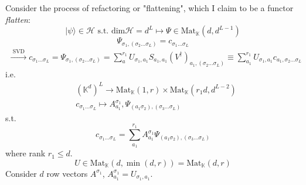\documentclass[10pt]{amsart}
\begin{document}
\begin{multicols*}{2}
Consider the process of refactoring or "flattening", which I claim to be a functor \emph{flatten}: 
\[
| \psi \rangle \in \mathcal{H} \text{ s.t. } \text{dim}\mathcal{H} = d^L \mapsto \Psi \in \text{Mat}_{\mathbb{K}}(d,d^{L-1})
\]
\[
\Psi_{\sigma_1, (\sigma_2 \dots \sigma_L) } = c_{\sigma_1 \dots \sigma_L}
\]
\begin{equation}
\begin{gathered}
\xrightarrow{ \text{ SVD } } c_{\sigma_1 \dots \sigma_L} = \Psi_{\sigma_1, (\sigma_2 \dots \sigma_L)} = \sum_a^{r_1} U_{\sigma_1, a_1} S_{a_1,a_1} (V^{\dag})_{a_1, (\sigma_2 \dots \sigma_L)} \equiv \sum_{a_1}^{r_1} U_{\sigma_1 , a_1} c_{a_1 , \sigma_2 \dots \sigma_L}
\end{gathered}
\end{equation}
i.e.
\[
\begin{aligned}
	& (\mathbb{K}^d)^L \to \text{Mat}_{\mathbb{K}}(1,r) \times \text{Mat}_{\mathbb{K}}(r_1 d, d^{L-2}) \\ 
	& c_{\sigma_1 \dots \sigma_L} \mapsto A_{a_1}^{\sigma_1} , \Psi_{(a_1\sigma_2), (\sigma_3\dots \sigma_L)} 
\end{aligned}
\]
s.t. 
\[
c_{\sigma_1\dots \sigma_L} = \sum_{a_1}^{r_1} A_{a_1}^{\sigma_1} \Psi_{(a_1\sigma_2), (\sigma_3 \dots \sigma_L)}
\]
where rank $r_1 \leq d$.  
\[
U \in \text{Mat}_{\mathbb{K}}(d,\min{(d,r)}) = \text{Mat}_{\mathbb{K}}(d,r)
\]
Consider $d$ row vectors $A^{\sigma_1}$, $A^{\sigma_1}_{a_1} = U_{\sigma_1,a_1}$.  


\end{multicols*}
\end{document}
